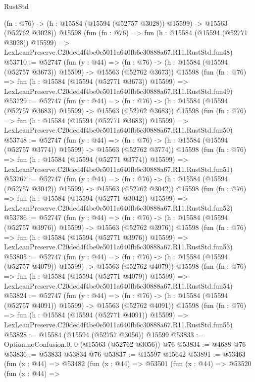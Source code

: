 \begin{lexlean}{RustStd}
\begin{coremodule}
    (fn : @76) -> (h : @15584 (@15594 (@52757 @3028)) @15599) -> @15563 (@52762 @3028))
    @15598
    (fun (fn : @76) =>
    fun (h : @15584 (@15594 (@52771 @3028)) @15599) =>
    LexLeanPreserve.C20ded4f4be0e5011a640fb6c30888a67.R11.RustStd.fun48)
@53710 := @52747
    (fun (y : @44) =>
    (fn : @76) -> (h : @15584 (@15594 (@52757 @3673)) @15599) -> @15563 (@52762 @3673))
    @15598
    (fun (fn : @76) =>
    fun (h : @15584 (@15594 (@52771 @3673)) @15599) =>
    LexLeanPreserve.C20ded4f4be0e5011a640fb6c30888a67.R11.RustStd.fun49)
@53729 := @52747
    (fun (y : @44) =>
    (fn : @76) -> (h : @15584 (@15594 (@52757 @3683)) @15599) -> @15563 (@52762 @3683))
    @15598
    (fun (fn : @76) =>
    fun (h : @15584 (@15594 (@52771 @3683)) @15599) =>
    LexLeanPreserve.C20ded4f4be0e5011a640fb6c30888a67.R11.RustStd.fun50)
@53748 := @52747
    (fun (y : @44) =>
    (fn : @76) -> (h : @15584 (@15594 (@52757 @3774)) @15599) -> @15563 (@52762 @3774))
    @15598
    (fun (fn : @76) =>
    fun (h : @15584 (@15594 (@52771 @3774)) @15599) =>
    LexLeanPreserve.C20ded4f4be0e5011a640fb6c30888a67.R11.RustStd.fun51)
@53767 := @52747
    (fun (y : @44) =>
    (fn : @76) -> (h : @15584 (@15594 (@52757 @3042)) @15599) -> @15563 (@52762 @3042))
    @15598
    (fun (fn : @76) =>
    fun (h : @15584 (@15594 (@52771 @3042)) @15599) =>
    LexLeanPreserve.C20ded4f4be0e5011a640fb6c30888a67.R11.RustStd.fun52)
@53786 := @52747
    (fun (y : @44) =>
    (fn : @76) -> (h : @15584 (@15594 (@52757 @3976)) @15599) -> @15563 (@52762 @3976))
    @15598
    (fun (fn : @76) =>
    fun (h : @15584 (@15594 (@52771 @3976)) @15599) =>
    LexLeanPreserve.C20ded4f4be0e5011a640fb6c30888a67.R11.RustStd.fun53)
@53805 := @52747
    (fun (y : @44) =>
    (fn : @76) -> (h : @15584 (@15594 (@52757 @4079)) @15599) -> @15563 (@52762 @4079))
    @15598
    (fun (fn : @76) =>
    fun (h : @15584 (@15594 (@52771 @4079)) @15599) =>
    LexLeanPreserve.C20ded4f4be0e5011a640fb6c30888a67.R11.RustStd.fun54)
@53824 := @52747
    (fun (y : @44) =>
    (fn : @76) -> (h : @15584 (@15594 (@52757 @4091)) @15599) -> @15563 (@52762 @4091))
    @15598
    (fun (fn : @76) =>
    fun (h : @15584 (@15594 (@52771 @4091)) @15599) =>
    LexLeanPreserve.C20ded4f4be0e5011a640fb6c30888a67.R11.RustStd.fun55)
@53828 := @15584 (@15594 (@52757 @3056)) @15599
@53833 := Option.noConfusion.{0, 0} (@15563 (@52762 @3056)) @76
@53834 := @4688 @76
@53836 := @53833 @53834 @76
@53837 := @15597 @15642
@53891 := @53463
    (fun (x : @44) =>
    @53482
      (fun (x : @44) =>
      @53501
        (fun (x : @44) =>
        @53520
          (fun (x : @44) =>

\end{coremodule}
\end{lexlean}
